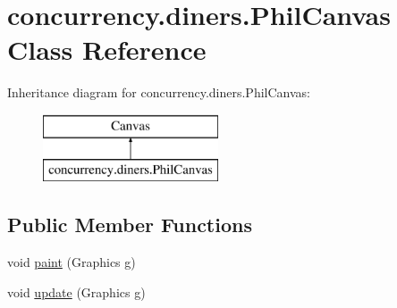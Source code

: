 \hypertarget{classconcurrency_1_1diners_1_1_phil_canvas}{}\section{concurrency.\+diners.\+Phil\+Canvas Class Reference}
\label{classconcurrency_1_1diners_1_1_phil_canvas}
Inheritance diagram for concurrency.\+diners.\+Phil\+Canvas\+:\begin{figure}[H]
\begin{center}
\leavevmode
\includegraphics[height=2.000000cm]{classconcurrency_1_1diners_1_1_phil_canvas}
\end{center}
\end{figure}
\subsection*{Public Member Functions}
\begin{DoxyCompactItemize}
\item 
void \mbox{\hyperlink{classconcurrency_1_1diners_1_1_phil_canvas_ae6c970b748039b6e92cdc49dcf5550e3}{paint}} (Graphics g)
\item 
void \mbox{\hyperlink{classconcurrency_1_1diners_1_1_phil_canvas_a504bf6cf1499dcfb022344ca1991080f}{update}} (Graphics g)
\end{DoxyCompactItemize}
